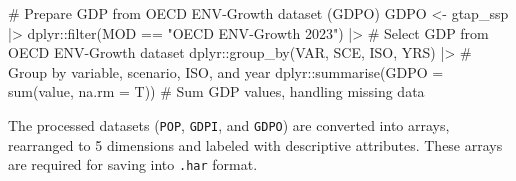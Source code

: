 \documentclass[
  letterpaper,
  DIV=11,
  numbers=noendperiod]{scrartcl}
\newenvironment{Shaded}{}{}
\newcommand{\AttributeTok}[1]{\textcolor[rgb]{0.00,0.34,0.68}{#1}}
\newcommand{\CommentTok}[1]{\textcolor[rgb]{0.54,0.53,0.53}{#1}}
\newcommand{\FunctionTok}[1]{\textcolor[rgb]{0.39,0.29,0.61}{#1}}
\newcommand{\NormalTok}[1]{\textcolor[rgb]{0.12,0.11,0.11}{#1}}
\newcommand{\OtherTok}[1]{\textcolor[rgb]{0.00,0.43,0.16}{#1}}
\newcommand{\SpecialCharTok}[1]{\textcolor[rgb]{0.24,0.68,0.91}{#1}}
\newcommand{\StringTok}[1]{\textcolor[rgb]{0.75,0.01,0.01}{#1}}
\begin{document}
\begin{Shaded}
\begin{Highlighting}[]
\CommentTok{\# Prepare GDP from OECD ENV{-}Growth dataset (GDPO)}
\NormalTok{GDPO }\OtherTok{\textless{}{-}}\NormalTok{ gtap\_ssp }\SpecialCharTok{|\textgreater{}}
\NormalTok{  dplyr}\SpecialCharTok{::}\FunctionTok{filter}\NormalTok{(MOD }\SpecialCharTok{==} \StringTok{"OECD ENV{-}Growth 2023"}\NormalTok{) }\SpecialCharTok{|\textgreater{}}                  \CommentTok{\# Select GDP from OECD ENV{-}Growth dataset}
\NormalTok{  dplyr}\SpecialCharTok{::}\FunctionTok{group\_by}\NormalTok{(VAR, SCE, ISO, YRS) }\SpecialCharTok{|\textgreater{}}                           \CommentTok{\# Group by variable, scenario, ISO, and year}
\NormalTok{  dplyr}\SpecialCharTok{::}\FunctionTok{summarise}\NormalTok{(}\AttributeTok{GDPO =} \FunctionTok{sum}\NormalTok{(value, }\AttributeTok{na.rm =}\NormalTok{ T))                     }\CommentTok{\# Sum GDP values, handling missing data}
\end{Highlighting}
\end{Shaded}

The processed datasets (\texttt{POP}, \texttt{GDPI}, and \texttt{GDPO})
are converted into arrays, rearranged to 5 dimensions and labeled with
descriptive attributes. These arrays are required for saving into
\texttt{.har} format.
\end{document}
